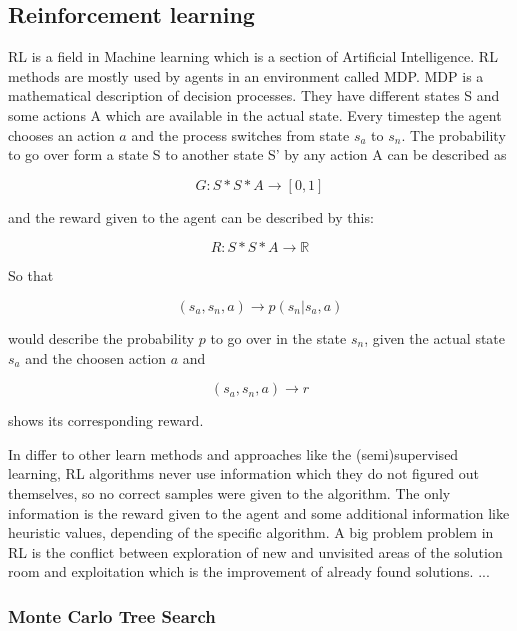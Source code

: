 \subsection{Reinforcement learning} 
 
\ac{RL} is a field in Machine learning which is a section of Artificial Intelligence. \ac{RL} methods are mostly used by agents in an environment called \ac{MDP}. \ac{MDP} is a mathematical description of decision processes. They have different states S and some actions A which are available in the actual state. Every timestep the agent chooses an action $a$ and the process switches from state $s_a$ to $s_n$. The probability to go over form a state S to another state S' by any action A can be described as

\begin{equation}
	G: S*S*A \rightarrow [0,1] 
\end{equation}

and the reward given to the agent can be described by this:

\begin{equation}
	R: S*S*A \rightarrow \mathbb{R}
\end{equation}

So that

\begin{equation}
	(s_a, s_n, a) \rightarrow p(s_n|s_a, a)
\end{equation}

would describe the probability $p$ to go over in the state $s_n$, given the actual state $s_a$ and the choosen action $a$ and 

\begin{equation}
	(s_a, s_n, a) \rightarrow r
\end{equation}

shows its corresponding reward.  


In differ to other learn methods and approaches like the (semi)supervised learning, RL algorithms never use information which they do not figured out themselves, so no correct samples were given to the algorithm. The only information is the reward given to the agent and some additional information like heuristic values, depending of the specific algorithm. 
A big problem problem in \ac{RL} is the conflict between exploration of new and unvisited areas of the solution room and exploitation which is the improvement of already found solutions.
...
\subsubsection{Monte Carlo Tree Search} 

